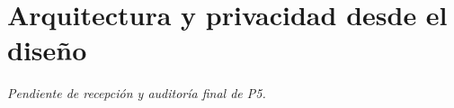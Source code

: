 \section{Arquitectura y privacidad desde el diseño}

\textit{Pendiente de recepción y auditoría final de P5.}
